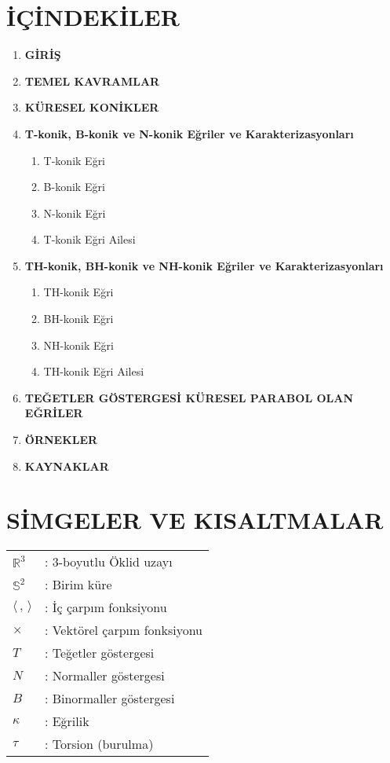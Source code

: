 \documentclass[a4paper,12pt]{article}
\begin{document}
\section*{İÇİNDEKİLER}

\begin{enumerate}
    \item \textbf{GİRİŞ}
    \item \textbf{TEMEL KAVRAMLAR}
    \item \textbf{KÜRESEL KONİKLER}
    \item \textbf{T-konik, B-konik ve N-konik Eğriler ve Karakterizasyonları}
    \begin{enumerate}
        \item T-konik Eğri
        \item B-konik Eğri
        \item N-konik Eğri
        \item T-konik Eğri Ailesi
    \end{enumerate}
    \item \textbf{TH-konik, BH-konik ve NH-konik Eğriler ve Karakterizasyonları}
    \begin{enumerate}
        \item TH-konik Eğri
        \item BH-konik Eğri
        \item NH-konik Eğri
        \item TH-konik Eğri Ailesi
    \end{enumerate}
    \item \textbf{TEĞETLER GÖSTERGESİ KÜRESEL PARABOL OLAN EĞRİLER}
    \item \textbf{ÖRNEKLER}
    \item \textbf{KAYNAKLAR}
\end{enumerate}

\newpage

\section*{SİMGELER VE KISALTMALAR}

\begin{tabular}{ll}
$\mathbb{R}^3$ & : 3-boyutlu Öklid uzayı \\
$\mathbb{S}^2$ & : Birim küre \\
$\langle \, , \, \rangle$ & : İç çarpım fonksiyonu \\
$\times$ & : Vektörel çarpım fonksiyonu \\
$T$ & : Teğetler göstergesi \\
$N$ & : Normaller göstergesi \\
$B$ & : Binormaller göstergesi \\
$\kappa$ & : Eğrilik \\
$\tau$ & : Torsion (burulma) \\
\end{tabular}
\end{document}
